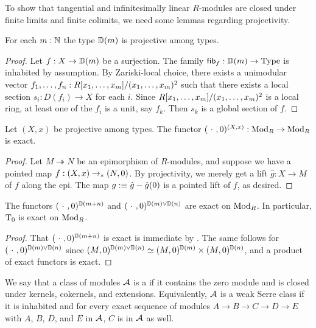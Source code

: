 To show that tangential and infinitesimally linear $R$-modules are closed under finite limits and finite colimits, we need some lemmas regarding projectivity.

\begin{lemma}\label{lem:disk-projective}
  For each $m : \mathbb{N}$ the type $\mathbb{D}(m)$ is projective among types.
\end{lemma}

\begin{proof}
  Let $f : X \to \mathbb{D}(m)$ be a surjection. The family $\mathsf{fib}_f : \mathbb{D}(m) \to \mathrm{Type}$ is inhabited by assumption. By Zariski-local choice, there exists a unimodular vector $f_1, \dots, f_n : R[x_1,\dots,x_m]/(x_1, \dots, x_m)^2$ such that there exists a local section $s_i : D(f_i) \to X$ for each $i$. Since $R[x_1,\dots,x_m]/(x_1, \dots, x_m)^2$ is a local ring, at least one of the $f_i$ is a unit, say $f_k$. Then $s_k$ is a global section of $f$.
\end{proof}

\begin{lemma}\label{lem:projective-exact}
  Let $(X,x)$ be projective among types.
  The functor $(\ \cdot\ ,0)^{(X,x)} : \textup{Mod}_{R} \rightarrow \textup{Mod}_{R}$ is exact.
\end{lemma}

\begin{proof}
  Let $M \twoheadrightarrow N$ be an epimorphism of $R$-modules, and suppose we have a pointed map $f : (X,x) \to_{\ast} (N,0)$.
  By projectivity, we merely get a lift $\hat{g} : X \rightarrow M$ of $f$ along the epi.
  The map $g :\equiv \hat{g} - \hat{g}(0)$ is a pointed lift of $f$, as desired.
\end{proof}

\begin{proposition}\label{prp:tangent-exact}
  The functors $(\ \cdot\ ,0)^{\mathbb{D}(m+n)}$ and $(\ \cdot\ ,0)^{\mathbb{D}(m) \vee \mathbb{D}(n)}$ are exact on $\textup{Mod}_{R}$.
  In particular, $\mathrm{T}_{0}$ is exact on $\textup{Mod}_{R}$.
\end{proposition}

\begin{proof}
  That $(\ \cdot\ ,0)^{\mathbb{D}(m+n)}$ is exact is immediate by .
  The same follows for $(\ \cdot\ ,0)^{\mathbb{D}(m) \vee \mathbb{D}(n)}$ since $(M,0)^{\mathbb{D}(m) \vee \mathbb{D}(n)} \simeq (M,0)^{\mathbb{D}(m)} \times (M,0)^{\mathbb{D}(n)}$, and a product of exact functors is exact.
\end{proof}

We say that a class of modules $\mathcal{A}$ is a  if it contains the zero module and is closed under kernels, cokernels, and extensions.
Equivalently, $\mathcal{A}$ is a weak Serre class if it is inhabited and for every exact sequence of modules $A \to B \to C \to D\to E$ with $A$, $B$, $D$, and $E$ in $\mathcal{A}$, $C$ is in $\mathcal{A}$ as well.

